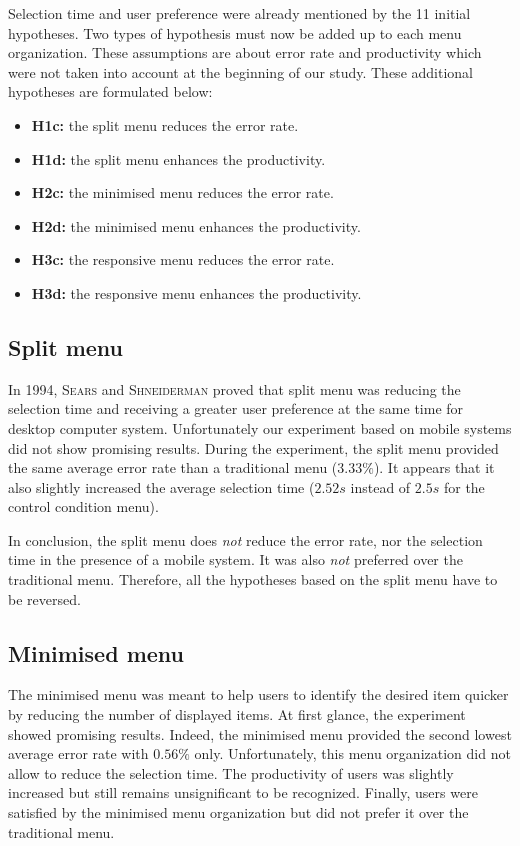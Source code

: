 Selection time and user preference were already mentioned by the 11 initial 
hypotheses. Two types of hypothesis must now be added up to each 
menu organization. These assumptions are about error rate and productivity 
which were not taken into account at the beginning of our study. These 
additional hypotheses are formulated below:

\begin{itemize}
 \item \textbf{H1c:} the split menu reduces the error rate.
 \item \textbf{H1d:} the split menu enhances the productivity.
 \item \textbf{H2c:} the minimised menu reduces the error rate.
 \item \textbf{H2d:} the minimised menu enhances the productivity.
 \item \textbf{H3c:} the responsive menu reduces the error rate.
 \item \textbf{H3d:} the responsive menu enhances the productivity.
\end{itemize}


\subsection{Split menu}
In 1994, \textsc{Sears} and \textsc{Shneiderman} proved that split menu 
was reducing the selection time and receiving a greater user preference at the 
same time for desktop computer system. Unfortunately our experiment based on 
mobile systems did not show promising results. During the experiment, the split 
menu provided the same average error rate than a traditional menu ($3.33\%$). 
It appears that it also slightly increased the average selection time ($2.52s$ 
instead of $2.5s$ for the control condition menu).\newline

In conclusion, the split menu does \textit{not} reduce the error rate, nor the 
selection time in the presence of a mobile system. It was also \textit{not} 
preferred over the traditional menu. Therefore, all the hypotheses based on the 
split menu have to be reversed.

\subsection{Minimised menu}
The minimised menu was meant to help users to identify the desired item 
quicker by reducing the number of displayed items. At first glance, the 
experiment showed promising results. Indeed, the minimised menu provided the 
second lowest average error rate with $0.56\%$ only. Unfortunately, this menu 
organization did not allow to reduce the selection time. The productivity of 
users was slightly increased but still remains unsignificant to be recognized. 
Finally, users were satisfied by the minimised menu organization but did not 
prefer it over the traditional menu.\newline

